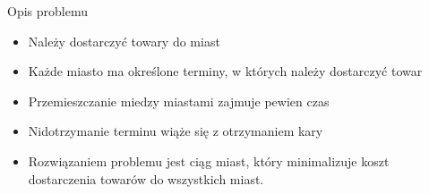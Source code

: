 \begin{block}{Opis problemu}
	\begin{itemize}
		\item Należy dostarczyć towary do miast
		\item Każde miasto ma określone terminy, w których należy dostarczyć towar
		\item Przemieszczanie miedzy miastami zajmuje pewien czas
		\item Nidotrzymanie terminu wiąże się z otrzymaniem kary
		\item Rozwiązaniem problemu jest ciąg miast, który minimalizuje koszt dostarczenia towarów do wszystkich miast.
	\end{itemize}
\end{block}
